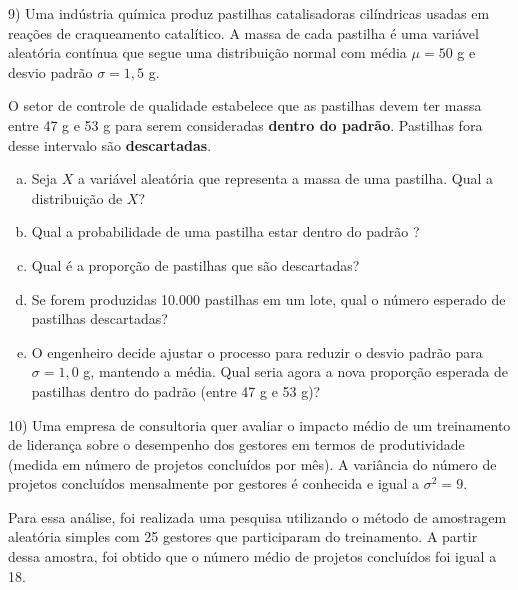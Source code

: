 \documentclass{article}
\begin{document}
9) Uma indústria química produz pastilhas catalisadoras cilíndricas usadas em reações de craqueamento catalítico.
 A massa de cada pastilha é uma variável aleatória contínua que segue uma distribuição normal com média
  \( \mu = 50 \) g e desvio padrão \( \sigma = 1{,}5 \) g.

O setor de controle de qualidade estabelece que as pastilhas devem ter massa entre 47 g e 53 g para serem consideradas \textbf{dentro do padrão}.
 Pastilhas fora desse intervalo são \textbf{descartadas}.

\begin{enumerate}[a)]
    \item Seja \( X \) a variável aleatória que representa a massa de uma pastilha. Qual a distribuição de \( X \)?
    
    \item Qual a probabilidade de uma pastilha estar dentro do padrão ?
    
    \item Qual é a proporção de pastilhas que são descartadas?
    
    \item Se forem produzidas 10.000 pastilhas em um lote, qual o número esperado de pastilhas descartadas?
    
    \item O engenheiro decide ajustar o processo para reduzir o desvio padrão para \( \sigma = 1{,}0 \) g, mantendo a média. 
    Qual seria agora a nova proporção esperada de pastilhas dentro do padrão (entre 47 g e 53 g)?
\end{enumerate}

\vspace{5px}


10) Uma empresa de consultoria quer avaliar o impacto médio de um treinamento de liderança sobre o desempenho dos gestores em termos de produtividade
 (medida em número de projetos concluídos por mês). A variância do número de projetos concluídos mensalmente por gestores é conhecida e igual a 
 \( \sigma^2 = 9 \).  

Para essa análise, foi realizada uma pesquisa utilizando o método de amostragem aleatória simples com 25 gestores que participaram do treinamento. A partir dessa amostra, foi obtido que o número médio de projetos concluídos foi igual a 18.  
\end{document}
